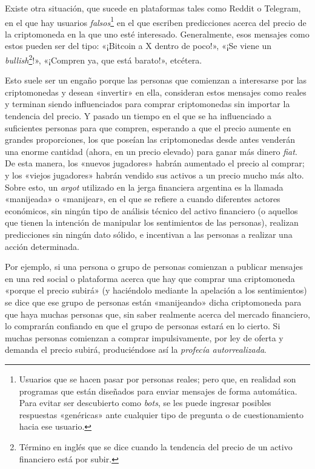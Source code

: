 \documentclass[12pt,a4paper,twoside]{book}
\begin{document}
Existe otra situación, que sucede en plataformas tales como Reddit o Telegram, en el que hay usuarios \textit{falsos}\footnote{Usuarios que se hacen pasar por personas reales; pero que, en realidad son programas que están diseñados para enviar mensajes de forma automática. Para evitar ser descubierto como \textit{bots}, se les puede ingresar posibles respuestas «genéricas» ante cualquier tipo de pregunta o de cuestionamiento hacia ese usuario.} en el que escriben predicciones acerca del precio de la criptomoneda en la que uno esté interesado. Generalmente, esos mensajes como estos pueden ser del tipo: «¡Bitcoin a X dentro de poco!», «¡Se viene un \textit{bullish}\footnote{Término en inglés que se dice cuando la tendencia del precio de un activo financiero está por subir.}!», «¡Compren ya, que está barato!», etcétera. 

Esto suele ser un engaño porque las personas que comienzan a interesarse por las criptomonedas y desean «invertir» en ella, consideran estos mensajes como reales y terminan siendo influenciados para comprar criptomonedas sin importar la tendencia del precio. Y pasado un tiempo en el que se ha influenciado a suficientes personas para que compren, esperando a que el precio aumente en grandes proporciones, los que poseían las criptomonedas desde antes venderán una enorme cantidad (ahora, en un precio elevado) para ganar más dinero \textit{fiat}. De esta manera, los «nuevos jugadores» habrán aumentado el precio al comprar; y los «viejos jugadores» habrán vendido sus activos a un precio mucho más alto. Sobre esto, un \textit{argot} utilizado en la jerga financiera argentina es la llamada «manijeada» o «manijear», en el que se refiere a cuando diferentes actores económicos, sin ningún tipo de análisis técnico del activo financiero (o aquellos que tienen la intención de manipular los sentimientos de las personas), realizan predicciones sin ningún dato sólido, e incentivan a las personas a realizar una acción determinada.

Por ejemplo, si una persona o grupo de personas comienzan a publicar mensajes en una red social o plataforma acerca que hay que comprar una criptomoneda «porque el precio subirá» (y haciéndolo mediante la apelación a los sentimientos) se dice que ese grupo de personas están «manijeando» dicha criptomoneda para que haya muchas personas que, sin saber realmente acerca del mercado financiero, lo comprarán confiando en que el grupo de personas estará en lo cierto. Si muchas personas comienzan a comprar impulsivamente, por ley de oferta y demanda el precio subirá, produciéndose así la \textit{profecía autorrealizada}. 
\end{document}
